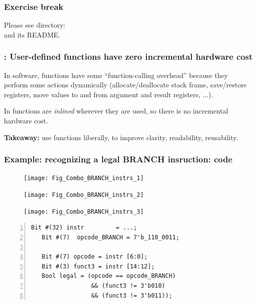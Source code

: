 
\begin{frame}
\frametitle{\EmojiExercise \hmm Exercise break}

Please see directory:  \\
and its README.
\end{frame}


\begin{frame}[fragile]
\frametitle{{\BSV}: User-defined functions have zero incremental hardware cost}

\footnotesize

In software, functions have some ``function-calling overhead'' because
they perform some actions dynamically (allocate/deallocate stack
frame, save/restore registers, move values to and from argument and
result registers, ...).

\vfill

In {\BSV} functions are \emph{inlined} wherever they are used, so
there is no incremental hardware cost.

\vfill

{\bf Takeaway:} use functions liberally, to improve clarity, readability, reusability.

\end{frame}


\begin{frame}[fragile]
\frametitle{Example: recognizing a legal BRANCH insruction: code}

\footnotesize

\begin{figure}[htbp]
  \centerline{\texttt{[image: Fig\_Combo\_BRANCH\_instrs\_1]}}
  \centerline{\texttt{[image: Fig\_Combo\_BRANCH\_instrs\_2]}}
  \vspace{2mm}
  \centerline{\texttt{[image: Fig\_Combo\_BRANCH\_instrs\_3]}}
\end{figure}

\begin{Verbatim}[frame=single, numbers=left]
   Bit #(32) instr         = ...;
   Bit #(7)  opcode_BRANCH = 7'b_110_0011;

   Bit #(7) opcode = instr [6:0];
   Bit #(3) funct3 = instr [14:12];
   Bool legal = (opcode == opcode_BRANCH)
                 && (funct3 != 3'b010)
                 && (funct3 != 3'b011));
\end{Verbatim}

\end{frame}

